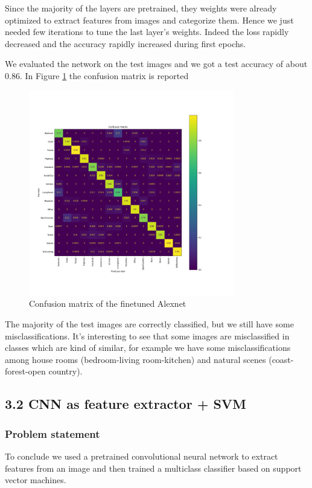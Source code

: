 \documentclass[12pt, a4paper]{report}
\begin{document}
Since the majority of the layers are  pretrained, they weights were already optimized to extract features from images and categorize them. Hence we just needed few iterations to tune the last layer's weights. Indeed the loss rapidly decreased and the accuracy rapidly increased during first epochs.

We evaluated the network on the test images and we got a test accuracy of about 0.86. In Figure \ref{fig:alexnetresults} the confusion matrix is reported

\begin{figure}[h!]
	\centering
	\includegraphics[width=0.8\textwidth]{img/conf_finetune}
	\caption{Confusion matrix of the finetuned Alexnet}	
	\label{fig:alexnetresults}
\end{figure}

The majority of the test images are correctly classified, but we still have some misclassifications.
It's interesting to see that some images are misclassified in classes which are kind of similar, for example we have some misclassifications among house rooms (bedroom-living room-kitchen) and natural scenes (coast-forest-open country).

\subsection*{3.2 CNN as feature extractor + SVM}

\subsubsection*{Problem statement}
To conclude we used a pretrained convolutional neural network to extract features from an image and then trained a multiclass classifier based on support vector machines.
\end{document}
